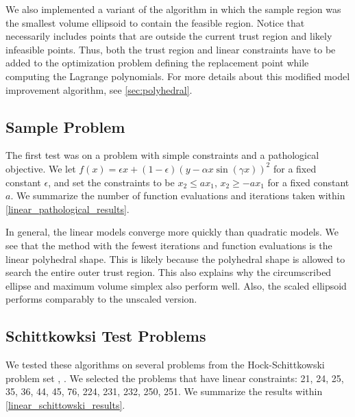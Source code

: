 We also implemented a variant of the algorithm in which the sample region was the smallest volume ellipsoid to contain the feasible region.
Notice that necessarily includes points that are outside the current trust region and likely infeasible points.
Thus, both the trust region and linear constraints have to be added to the optimization problem defining the replacement point while computing the Lagrange polynomials.
For more details about this modified model improvement algorithm, see \cref{sec:polyhedral}.

\subsection{Sample Problem}
The first test was on a problem with simple constraints and a pathological objective.
We let $f(x) = \epsilon x + (1-\epsilon)(y - \alpha x \sin(\gamma x))^2$ for a fixed constant $\epsilon$, and set the constraints to be
$x_2 \le ax_1$, $x_2 \ge -ax_1$ for a fixed constant $a$.
We summarize the number of function evaluations and iterations taken within \cref{linear_pathological_results}.

In general, the linear models converge more quickly than quadratic models.
We see that the method with the fewest iterations and function evaluations is the linear polyhedral shape.
This is likely because the polyhedral shape is allowed to search the entire outer trust region.
This also explains why the circumscribed ellipse and maximum volume simplex also perform well.
Also, the scaled ellipsoid performs comparably to the unscaled version.

\subsection{Schittkowksi Test Problems}


We tested these algorithms on several problems from the Hock-Schittkowski problem set \cite{Schittkowski:1987:MTE:27135}, \cite{Hock1980}.
We selected the problems that have linear constraints: 21, 24, 25, 35, 36, 44, 45, 76, 224, 231, 232, 250, 251.
We summarize the results within \cref{linear_schittowski_results}.


